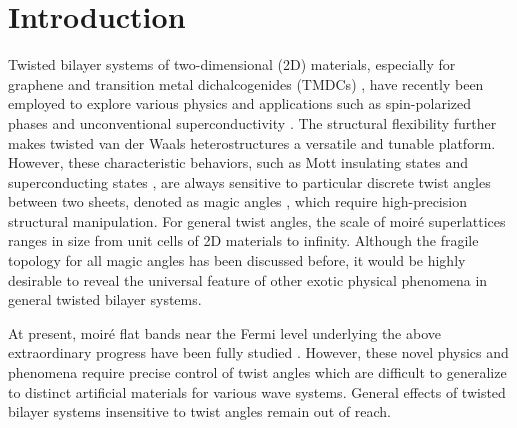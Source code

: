 \documentclass[%
reprint,
amsmath,amssymb,amsfonts
aps,
superscriptaddress,
prx
]{revtex4-1}
\begin{document}
\maketitle
\section{Introduction} 
Twisted bilayer systems of two-dimensional (2D) materials, especially for graphene \cite{f1_graphene,f2_graphene} and transition metal dichalcogenides (TMDCs) \cite{f1_TMDs,f2_TMDs}, have recently been employed to explore various physics and applications such as spin-polarized phases \cite{spin1_polarized,spin2_polarized,spin3_polarized,spin4_polarized} and unconventional superconductivity \cite{cond1_graphene,cond2_graphene,cond3_graphene}. 
The structural flexibility further makes twisted van der Waals heterostructures \cite{van1_der,van2_der,van3_der,van4_der} a versatile and tunable platform. 
However, these characteristic behaviors, such as Mott insulating states \cite{mott1_insulator,mott2_insulator,mott3_insulator,mott4_insulator} and superconducting states \cite{spin2_polarized,super1_cond,super2_cond,super3_cond}, are always sensitive to particular discrete twist angles between two sheets, denoted as magic angles \cite{cond2_graphene,magic1,magic2,magic3}, which require high-precision structural manipulation. 
For general twist angles, the scale of moir\'{e} superlattices \cite{super1_lattice,super2_lattice,super3_lattice} ranges in size from unit cells of 2D materials to infinity. 
Although the fragile topology \cite{fragile1,fragile2} for all magic angles has been discussed before, it would be highly desirable to reveal the universal feature of other exotic physical phenomena in general twisted bilayer systems.

At present, moir\'{e} flat bands near the Fermi level underlying the above extraordinary progress have been fully studied \cite{moire_band1,moire_band2}. However, these novel physics and phenomena require precise control of twist angles which are difficult to generalize to distinct artificial materials for various wave systems. General effects of twisted bilayer systems insensitive to twist angles remain out of reach. 
\end{document}
